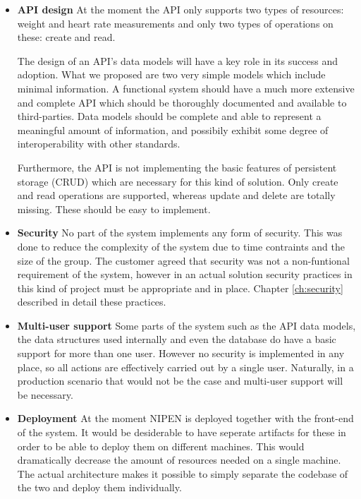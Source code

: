 \begin{itemize}
\item\textbf{API design}\newline
At the moment the API only supports two types of resources: weight and heart rate measurements
and only two types of operations on these: create and read.

The design of an API's data models will have a key role in its success and adoption.
What we proposed are two very simple models which include minimal information.
A functional system should have a much more extensive and complete API
which should be thoroughly documented and available to third-parties.
Data models should be complete and able to represent a meaningful amount of information,
and possibily exhibit some degree of interoperability with other standards.

Furthermore, the API is not implementing the basic features of persistent storage (CRUD)
which are necessary for this kind of solution. Only create and read operations are supported,
whereas update and delete are totally missing. These should be easy to implement.

\item\textbf{Security}\newline
No part of the system implements any form of security.
This was done to reduce the complexity of the system due to time contraints and the size of the group.
The customer agreed that security was not a non-funtional requirement of the system, however
in an actual solution security practices in this kind of project must be appropriate and in place.
Chapter \ref{ch:security} described in detail these practices.

\item\textbf{Multi-user support}\newline
Some parts of the system such as the API data models, the data structures used internally and even
the database do have a basic support for more than one user. However no security
is implemented in any place, so all actions are effectively carried out by a single user.
Naturally, in a production scenario that would not be the case and multi-user support will
be necessary.

\item\textbf{Deployment}\newline
At the moment NIPEN is deployed together with the front-end of the system.
It would be desiderable to have seperate artifacts for these in order to be able to deploy them
on different machines. This would dramatically decrease the amount of resources needed on a single
machine. The actual architecture makes it possible to simply separate the codebase of the two
and deploy them individually.
\end{itemize}



